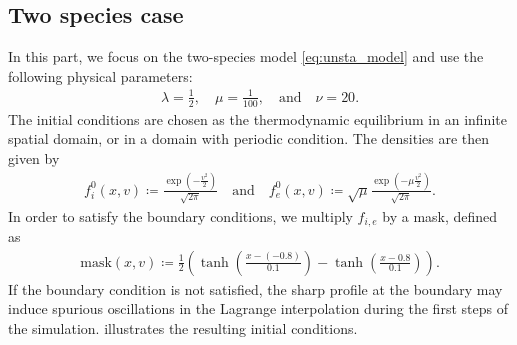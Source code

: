 \documentclass{article}
\numberwithin{equation}{section}
\begin{document}
\subsection{Two species case} %
In this part, we focus on the two-species model \eqref{eq:unsta_model} 
and use the following physical parameters:
\begin{align}\label{eq:param_simu}
	\lambda = \frac{1}{2}, \quad \mu = \frac{1}{100}, \quad\text{and}\quad \nu = 20.
\end{align}
The initial conditions are chosen as the thermodynamic equilibrium in an infinite spatial domain, or in a domain with periodic condition. The densities are then given by
\begin{align}
\label{init_twospecies}
	f_{i}^0 (x,v) \coloneqq \frac{\exp\left(- \frac{v^2}{2}\right)}{\sqrt{2\pi}} \quad \text{and} \quad f_{e}^0 (x,v) \coloneqq \sqrt{\mu}\frac{\exp\left(- \mu \frac{v^2}{2}\right)}{\sqrt{2\pi}}.
\end{align}
In order to satisfy the boundary conditions, we multiply $f_{i,e}$ by a mask, defined as
\begin{align*}
	\text{mask}(x,v) \coloneqq \frac{1}{2} \left(\tanh\left(\frac{x - (-0.8)}{0.1}\right) - \tanh\left(\frac{x - 0.8}{0.1}\right)\right).
\end{align*}
If the boundary condition is not satisfied, the sharp profile at the boundary may induce spurious oscillations in the Lagrange interpolation during the first steps of the simulation.
 illustrates the resulting initial conditions.
\end{document}
